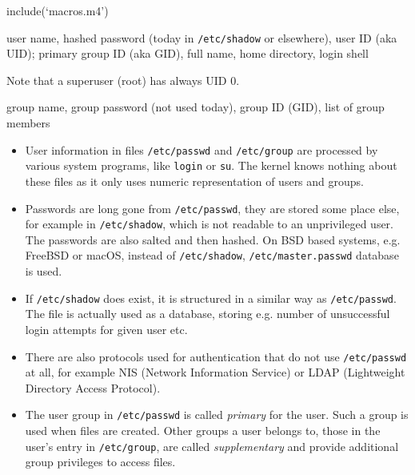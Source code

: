 include(`macros.m4')

\pagebreak
{}

\begin{slide}
\end{slide}

\begin{slide}
\begin{center}
\end{center}
\vspace{2ex}

 user name,
hashed password (today in \texttt{/etc/shadow} or elsewhere), user ID (aka UID);
primary group ID (aka GID), full name, home directory, login shell

Note that a superuser (root) has always UID 0.

\vspace{2ex}
\begin{center}
\end{center}
\vspace{2ex}

 group name, group password (not
used today), group ID (GID), list of group members
\end{slide}

\begin{itemize}
\item User information in files \texttt{/etc/passwd} and \texttt{/etc/group} are
processed by various system programs, like \texttt{login} or \texttt{su}.
The kernel knows nothing about these files as it only uses numeric
representation of users and groups.
\item Passwords are long gone from \texttt{/etc/passwd}, they are stored some
place else, for example in \texttt{/etc/shadow}, which is not readable to an
unprivileged user.  The passwords are also salted and then hashed. On BSD based
systems, e.g. FreeBSD or macOS, instead of \texttt{/etc/shadow},
\texttt{/etc/master.passwd} database is used.
\item If \texttt{/etc/shadow} does exist, it is structured in a similar way as
\texttt{/etc/passwd}. The file is actually used as a database, storing e.g.
number of unsuccessful login attempts for given user etc.
\item There are also protocols used for authentication that do not use
\texttt{/etc/passwd} at all, for example NIS (Network Information Service) or
LDAP (Lightweight Directory Access Protocol).
\item The user group in \texttt{/etc/passwd} is called \emph{primary} for the
user.  Such a group is used when files are created.  Other groups a user belongs
to, those in the user's entry in \texttt{/etc/group}, are called
\emph{supplementary} and provide additional group privileges to access files.
\end{itemize}

